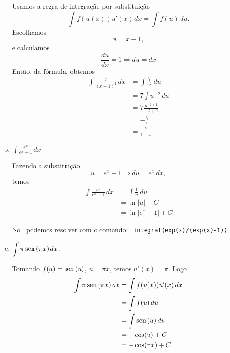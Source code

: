 \cleardoublepage\documentclass[../main.tex]{subfiles}
\begin{document}
\begin{ex}
\begin{enumerate}[a)]
  Usamos a regra de integração por substituição
  \begin{equation*}
    \int f(u(x))u'(x)\,dx = \int f(u)\,du.
  \end{equation*}
  Escolhemos
  \begin{equation*}
    u = x-1,
  \end{equation*}
  e calculamos
  \begin{equation*}
    \frac{du}{dx} = 1 \Rightarrow du = dx
  \end{equation*}
  Então, da fórmula, obtemos
  \begin{align*}
    \int \frac{7}{(x-1)^2}\,dx &= \int \frac{7}{u^2}\,du\\
                               &= 7\int u^{-2}\,du\\
                               &= 7\frac{u^{-2+1}}{-2+1}\\
                               &= -\frac{7}{u}\\
                               &= \frac{7}{1-x}
  \end{align*}

\item $ \int \frac{e^x}{e^x - 1}\,dx$

  Fazendo a substituição
  \begin{equation*}
    u = e^x-1 \Rightarrow du = e^x\,dx,
  \end{equation*}
  temos
  \begin{align*}
    \int \frac{e^x}{e^x - 1}\,dx &= \int \frac{1}{u}\,du \\
                                 &= \ln|u| + C \\
                                 &= \ln|e^x-1|+C
  \end{align*}

  No \geogebra~podemos resolver com o comando: \verb| integral(exp(x)/(exp(x)-1))|

\item $\displaystyle\int \pi\operatorname{sen}\,(\pi x)\,dx$.
    
    Tomando $f(u)=\operatorname{sen}\,(u)$, $u=\pi x$, temos $u'(x)=\pi$. Logo
    \begin{align*}
      \int \pi\operatorname{sen}\,(\pi x)\,dx &= \int f(u(x))u'(x)\,dx \\
                              &= \int f(u)\,du \\
                              &= \int \operatorname{sen}\,(u)\,du \\
                              &= -\cos(u) + C \\
                              &= -\cos(\pi x) + C
    \end{align*}
   \end{enumerate}
\end{ex}
\end{document}
